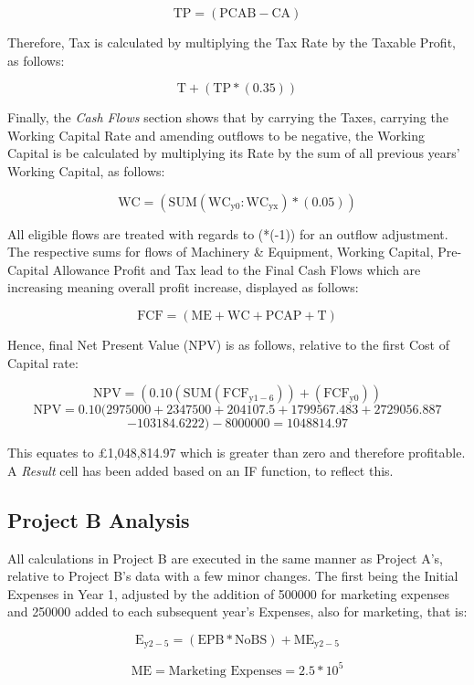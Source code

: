 \documentclass[11pt, english]{article}
\begin{document}
	$$\mathrm{TP=(PCAB-CA)}$$

	Therefore, Tax is calculated by multiplying the Tax Rate by the Taxable Profit, as follows:

	$$\mathrm{T+(TP*(0.35))}$$

	Finally, the \textit{Cash Flows} section shows that by carrying the Taxes, carrying the Working Capital Rate and amending outflows to be negative, the Working Capital is be calculated by multiplying its Rate by the sum of all previous years' Working Capital, as follows:

	$$\mathrm{WC=(SUM(WC_{y0}:WC_{yx})*(0.05))}$$

	All eligible flows are treated with regards to (*(-1)) for an outflow adjustment. The respective sums for flows of Machinery \& Equipment, Working Capital, Pre-Capital Allowance Profit and Tax lead to the Final Cash Flows which are increasing meaning overall profit increase, displayed as follows:

	$$\mathrm{FCF=(ME+WC+PCAP+T)}$$

	Hence, final Net Present Value (NPV) is as follows, relative to the first Cost of Capital rate:

	$$\mathrm{NPV=(0.10(SUM(FCF_{y1-6}))+(FCF_{y0}))}$$ $$\mathrm{NPV=0.10(2975000+2347500+204107.5+1799567.483+2729056.887}$$ $$\mathrm{-103184.6222)-8000000=1048814.97}$$

	This equates to \pounds1,048,814.97 which is greater than zero and therefore profitable. A \textit{Result} cell has been added based on an IF function, to reflect this.

	\subsection{Project B Analysis}

	All calculations in Project B are executed in the same manner as Project A's, relative to Project B's data with a few minor changes. The first being the Initial Expenses in Year 1, adjusted by the addition of 500000 for marketing expenses and 250000 added to each subsequent year's Expenses, also for marketing, that is:

	$$\mathrm{E_{y2-5}=(EPB*NoBS)+ME_{y2-5}}$$

	$$\mathrm{ME=\textrm{Marketing Expenses}=2.5*10^5}$$
\end{document}
